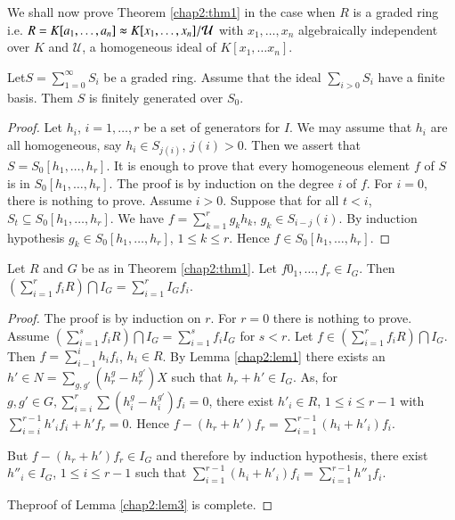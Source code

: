 We shall  now prove  Theorem \ref{chap2:thm1} in the  case  when  $R$
is a graded 
ring i.e. $R =K [a_1, \ldots , a_n] \thickapprox  K[x_1, \ldots
  ,x_n] / \mathcal{U}$  with $x_1,\ldots,x_n $ algebraically
independent  over   $K$ and $\mathcal{U}$, a homogeneous ideal of  $K
[x_1, \ldots x_n]$.  

\begin{lem}\label{chap2:lem2}%
 Let\pageoriginale  $S =   \sum\limits^\infty_{1=0}   S_i $ be a graded
  ring. Assume that the ideal $\sum\limits_{i>0}  S_i$ have a finite
  basis. Them $S$ is finitely generated over $S_0$. 
\end{lem}

\begin{proof}
  Let $ h_i$, $i = 1,\ldots, r $ be a set of generators for $I$. We may
  assume that $h_i$ are all homogeneous, say $h_i \in S_{j(i)}$,
  $j(i)>0$. Then we assert that $ S = S_0[h_1, \ldots ,h_r]$. It is
  enough to prove that every homogeneous element $f$ of $S$ is in $
  S_0 [h_1, \ldots ,h_r]$. The proof is by induction on the degree $i$
  of $f$. For $i = 0$, there is nothing to prove.   
Assume  $i > 0$.  Suppose that for all $ t < i$, $S_t \subseteq S_0
[h_1, \ldots ,h_r]$. We have $ f =\sum\limits_{k=1}^r g_k  h_k$,  $g_k
\in  S_{i-j}(i)$. By induction hypothesis $g_k \in S_0 [h_1, \ldots
  ,h_r]$, $1 \leq k \leq r$. Hence $  f \in S_0 [h_1, \ldots ,h_r]$. 
\end{proof}

\begin{lem}\label{chap2:lem3}%
 Let $R$ and $G$ be as in Theorem \ref{chap2:thm1}. Let $f0_1, \ldots ,
  f_r \in I_G$.  Then  $(\sum\limits^r_{i=1} f_i R )\bigcap I_G =
  \sum\limits_{i=1}^r I_G f_i$.  
\end{lem}

\begin{proof}
 The proof is by induction on $r$. For $r = 0$ there is nothing  to
 prove. Assume $(\sum\limits_{i=1}^s  f_iR)  \bigcap I_G =
 \sum\limits_{i=1}^s f_i I_G$ for $ s<r$. Let $f \in (
 \sum\limits^r_{i=1} f_i R )\bigcap I_G$. Then $  f=
 \sum\limits_{i-1}^i h_i f_i$, $h_i \in R$. By Lemma  \ref{chap2:lem1}
 there exists an 
 $h' \in N = \sum\limits_{g, g'}(h^{g}_r - h^{g'}_r) X$ such that $
 h_r +h' \in I_G$. As, for  $g, g' \in G, \sum\limits_{i=i}^r\sum
 (h^{g}_i - h^{g'}_i) f_i =0$, there exist $ h'_i \in R$, $1 \leq i
 \leq r-1$ with $\sum\limits_{i=i}^{r-1} h'_i f_i + h' f_r = 0$. Hence
 $ f - (h_r + h') f_r =  \sum\limits_{i=1}^{r-1} (h_i + h'_i) f_i$. 
 
 But $ f - (h_r + h') f_r \in I_G $ and therefore by induction
 hypothesis, there exist $ h''_i \in I_G$, $1 \leq i \leq r-1 $  such
 that $ \sum\limits_{i=1}^{r-1} (h_i +h'_i) f_i =
 \sum\limits_{i=1}^{r-1} h''_1 f_i$. 
 
 The\pageoriginale proof of Lemma  \ref{chap2:lem3} is complete. 
 \end{proof}
 
